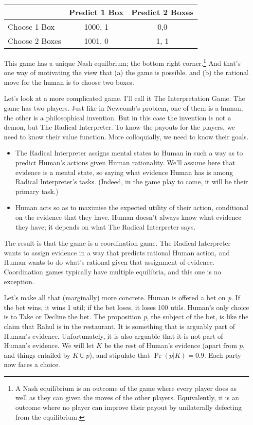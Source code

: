 \documentclass[11pt,]{book}
\providecommand{\tightlist}{%
  \setlength{\itemsep}{0pt}\setlength{\parskip}{0pt}}
\let\rmarkdownfootnote\footnote%
\def\footnote{\protect\rmarkdownfootnote}
\def\toprule{}
\def\bottomrule{}
\def\midrule{}
\begin{document}
\begin{longtable}[]{@{}lcc@{}}
\toprule
& Predict 1 Box & Predict 2 Boxes\tabularnewline
\midrule
\endhead
Choose 1 Box & 1000, 1 & 0,0\tabularnewline
Choose 2 Boxes & 1001, 0 & 1, 1\tabularnewline
\bottomrule
\end{longtable}

This game has a unique Nash equilbrium; the bottom right corner.\footnote{A Nash equilibrium is an outcome of the game where every player does as well as they can given the moves of the other players. Equivalently, it is an outcome where no player can improve their payout by unilaterally defecting from the equilibrium.} And that's one way of motivating the view that (a) the game is possible, and (b) the rational move for the human is to choose two boxes.

Let's look at a more complicated game. I'll call it The Interpretation Game. The game has two players. Just like in Newcomb's problem, one of them is a human, the other is a philosophical invention. But in this case the invention is not a demon, but The Radical Interpreter. To know the payouts for the players, we need to know their value function. More colloquially, we need to know their goals.

\begin{itemize}
\tightlist
\item
  The Radical Interpreter assigns mental states to Human in such a way as to predict Human's actions given Human rationality. We'll assume here that evidence is a mental state, so saying what evidence Human has is among Radical Interpreter's tasks. (Indeed, in the game play to come, it will be their primary task.)
\item
  Human acts so as to maximise the expected utility of their action, conditional on the evidence that they have. Human doesn't always know what evidence they have; it depends on what The Radical Interpreter says.
\end{itemize}

The result is that the game is a coordination game. The Radical Interpreter wants to assign evidence in a way that predicts rational Human action, and Human wants to do what's rational given that assignment of evidence. Coordination games typically have multiple equilibria, and this one is no exception.

Let's make all that (marginally) more concrete. Human is offered a bet on \emph{p}. If the bet wins, it wins 1 util; if the bet loses, it loses 100 utils. Human's only choice is to Take or Decline the bet. The proposition \emph{p}, the subject of the bet, is like the claim that Rahul is in the restaurant. It is something that is arguably part of Human's evidence. Unfortunately, it is also arguable that it is not part of Human's evidence. We will let \(K\) be the rest of Human's evidence (apart from \(p\), and things entailed by \(K \cup p\)), and stipulate that \(\Pr(p | K) = 0.9\). Each party now faces a choice.
\end{document}
